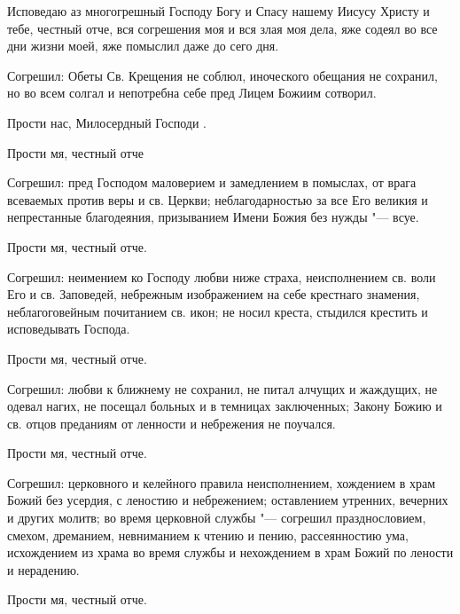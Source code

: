 \begin{mymulticols}
 
Исповедаю аз многогрешный  Господу Богу и Спасу нашему Иисусу Христу и тебе, честный отче, вся согрешения моя и вся злая моя дела, яже содеял во все дни жизни моей, яже помыслил даже до сего дня. 



Согрешил: Обеты Св. Крещения не соблюл, иноческого обещания не сохранил, но во всем солгал и непотребна себе пред Лицем Божиим сотворил. 



Прости нас, Милосердный Господи .

Прости мя, честный отче  



Согрешил: пред Господом маловерием и замедлением в помыслах, от врага всеваемых против веры и св. Церкви; неблагодарностью за все Его великия и непрестанные благодеяния, призыванием Имени Божия без нужды "--- всуе. 



Прости мя, честный отче. 



Согрешил: неимением ко Господу любви ниже страха, неисполнением св. воли Его и св. Заповедей, небрежным изображением на себе крестнаго знамения, неблагоговейным почитанием св. икон; не носил креста, стыдился крестить и исповедывать Господа. 



Прости мя, честный отче. 



Согрешил: любви к ближнему не сохранил, не питал алчущих и жаждущих, не одевал нагих, не посещал больных и в темницах заключенных; Закону Божию и св. отцов преданиям от ленности и небрежения не поучался. 



Прости мя, честный отче. 



Согрешил: церковного и келейного правила неисполнением, хождением в храм Божий без усердия, с леностию и небрежением; оставлением утренних, вечерних и других молитв; во время церковной службы "--- согрешил празднословием, смехом, дреманием, невниманием к чтению и пению, рассеянностию ума, исхождением из храма во время службы и нехождением в храм Божий по лености и нерадению. 



Прости мя, честный отче. 




\end{mymulticols}
